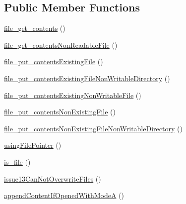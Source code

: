\subsection*{Public Member Functions}
\begin{DoxyCompactItemize}
\item 
\mbox{\hyperlink{classorg_1_1bovigo_1_1vfs_1_1vfs_stream_wrapper_file_test_case_ae976196cf815d2c328652c5a4a490814}{file\+\_\+get\+\_\+contents}} ()
\item 
\mbox{\hyperlink{classorg_1_1bovigo_1_1vfs_1_1vfs_stream_wrapper_file_test_case_a4909519f2708b4943198087ca531c100}{file\+\_\+get\+\_\+contents\+Non\+Readable\+File}} ()
\item 
\mbox{\hyperlink{classorg_1_1bovigo_1_1vfs_1_1vfs_stream_wrapper_file_test_case_a53f066fda1f4ddd9a3421be6387c77d8}{file\+\_\+put\+\_\+contents\+Existing\+File}} ()
\item 
\mbox{\hyperlink{classorg_1_1bovigo_1_1vfs_1_1vfs_stream_wrapper_file_test_case_a03ef4bc39dc73c1638171a935d61cf52}{file\+\_\+put\+\_\+contents\+Existing\+File\+Non\+Writable\+Directory}} ()
\item 
\mbox{\hyperlink{classorg_1_1bovigo_1_1vfs_1_1vfs_stream_wrapper_file_test_case_a0b1f0acf978864a8bf3961e8b5673c59}{file\+\_\+put\+\_\+contents\+Existing\+Non\+Writable\+File}} ()
\item 
\mbox{\hyperlink{classorg_1_1bovigo_1_1vfs_1_1vfs_stream_wrapper_file_test_case_a487619159f272512910776d734d4d7e2}{file\+\_\+put\+\_\+contents\+Non\+Existing\+File}} ()
\item 
\mbox{\hyperlink{classorg_1_1bovigo_1_1vfs_1_1vfs_stream_wrapper_file_test_case_af02168e03ba32b008570f441a1dfc7f5}{file\+\_\+put\+\_\+contents\+Non\+Existing\+File\+Non\+Writable\+Directory}} ()
\item 
\mbox{\hyperlink{classorg_1_1bovigo_1_1vfs_1_1vfs_stream_wrapper_file_test_case_a7455737f501dd4201b87cb45be2f76c0}{using\+File\+Pointer}} ()
\item 
\mbox{\hyperlink{classorg_1_1bovigo_1_1vfs_1_1vfs_stream_wrapper_file_test_case_a62e62833982b80985555b74ff8c81e9c}{is\+\_\+file}} ()
\item 
\mbox{\hyperlink{classorg_1_1bovigo_1_1vfs_1_1vfs_stream_wrapper_file_test_case_a6968d250a20eadf8ac2bf5496552e742}{issue13\+Can\+Not\+Overwrite\+Files}} ()
\item 
\mbox{\hyperlink{classorg_1_1bovigo_1_1vfs_1_1vfs_stream_wrapper_file_test_case_af6e1e2aa6502745b41f75f99303d0b31}{append\+Content\+If\+Opened\+With\+ModeA}} ()
\item 

\end{DoxyCompactItemize}
